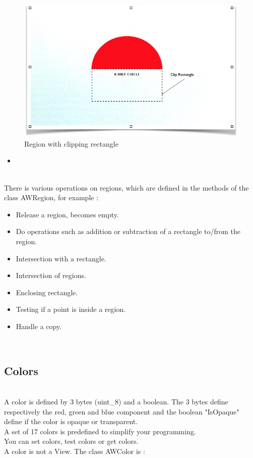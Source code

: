 \documentclass[a4paper,11pt]{extarticle}
\begin{document}
\begin{figure}[htbp]
   \centering
   \includegraphics[scale=0.55]{AWFig8.png} 
   \caption{Region with clipping rectangle}
   \label{fig:8 }
\end{figure}

\begin{itemize}
\item 
\end{itemize}

~\\ There is various operations on regions, which are defined in the methods of the class AWRegion, for example :

\begin{itemize}
\item Release a region, becomes empty.
\item Do operations such as addition or subtraction of a rectangle to/from the region.
\item Intersection with a rectangle.
\item Intersection of regions.
\item Enclosing rectangle.
\item Testing if a point is inside a region.
\item Handle a copy.
\end{itemize}

~\\ 

\newpage
\subsection{Colors}

~\\ A color is defined by 3 bytes (uint\_8) and a boolean. The 3 bytes define respectively the red, green and blue component and the boolean "IsOpaque" define if the color is opaque or transparent.
~\\ A set of 17 colors is predefined to simplify your programming.
~\\ You can set colors, test colors or get colors.
~\\ A color is not a View. The class AWColor is :
\end{document}
